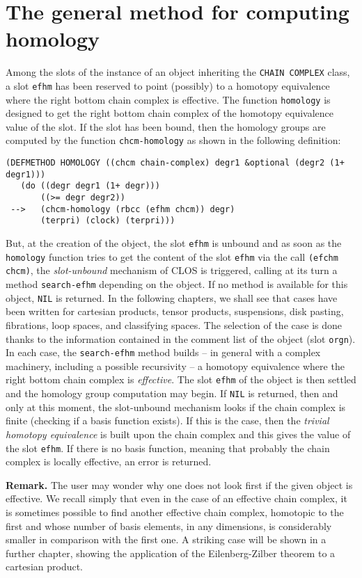 \section {The general method for computing homology}

Among the slots of the instance of an  object
inheriting the {\tt CHAIN COMPLEX} class, a slot {\tt efhm}
has been reserved to point (possibly) to a homotopy e\-qui\-va\-len\-ce where the right bottom
chain complex is effective. The function {\tt homology} is designed to get
the right bottom chain complex of the homotopy equivalence value of the slot. If the
slot has been bound, then the homology groups are computed by the function {\tt chcm-homology}
as shown in the following de\-fi\-ni\-ti\-on:
{\footnotesize\begin{verbatim}
(DEFMETHOD HOMOLOGY ((chcm chain-complex) degr1 &optional (degr2 (1+ degr1)))
   (do ((degr degr1 (1+ degr)))
       ((>= degr degr2))
 -->   (chcm-homology (rbcc (efhm chcm)) degr)
       (terpri) (clock) (terpri)))
\end{verbatim}}
But, at the creation of the object, the slot {\tt efhm} is  unbound and as soon as the {\tt homology}
function tries to get the content of the slot {\tt efhm} via the call {\tt (efchm chcm)}, the
{\em slot-unbound} mechanism of CLOS is triggered, calling at its turn a method
{\tt search-efhm} depending on the object. If no method is available for this object,
{\tt NIL} is returned. In the following chapters, we shall see that cases have been
written for cartesian products, tensor products, suspensions, disk pasting, fibrations,
loop spaces, and classifying spaces. The selection of the case is done thanks to the information
contained in the comment list of the object (slot {\tt orgn}).
In each case,  the {\tt search-efhm} method builds -- in general with a complex machinery, including a possible
recursivity --
a homotopy equivalence where the right bottom
chain complex is {\em effective}. The slot {\tt efhm} of the object is then settled and the homology group
computation may begin. If {\tt NIL} is returned, then  and only at this moment, the slot-unbound
mechanism looks if the chain complex is finite (checking if a basis function exists). If this is the case, then
the {\em trivial homotopy equivalence} is built upon the chain complex and this gives the value of the slot
{\tt efhm}. If there is no basis function,  meaning that probably the chain complex is locally
effective, an error is returned.
\par
{\bf Remark.} The user may wonder why one does not  look first if the given object is effective.
We recall simply that even in the case of an effective chain complex, it is sometimes
possible to find another effective chain complex, homotopic to the first and whose
number of basis elements, in any dimensions, is considerably smaller in comparison with the first one.
A striking case will be shown in a further chapter, showing the application of the
Eilenberg-Zilber theorem to a cartesian product.

